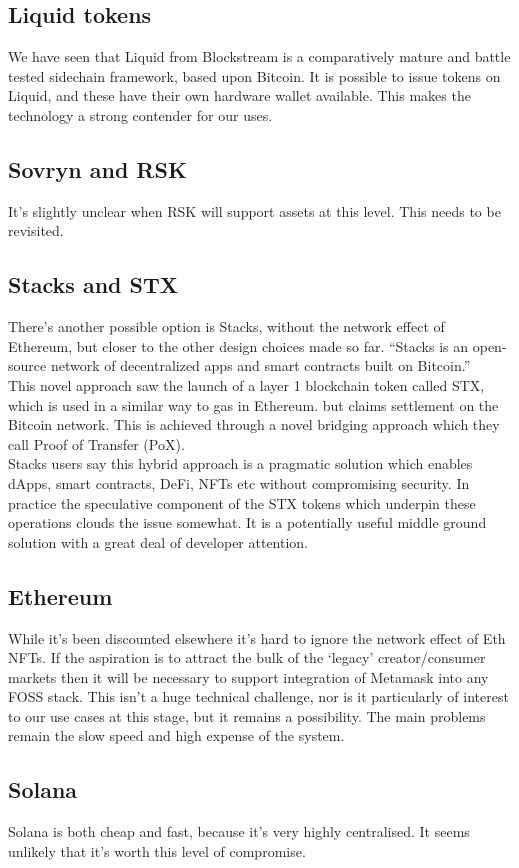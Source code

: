 \subsection{Liquid tokens}
We have seen that Liquid from Blockstream is a comparatively mature and battle tested sidechain framework, based upon Bitcoin. It is possible to issue tokens on Liquid, and these have their own hardware wallet available. This makes the technology a strong contender for our uses.
\subsection{Sovryn and RSK}
It's slightly unclear when RSK will support assets at this level. This needs to be revisited.
\subsection{Stacks and STX}
There's another possible option is Stacks, without the network effect of Ethereum, but closer to the other design choices made so far. ``Stacks is an open-source network of decentralized apps and smart contracts built on Bitcoin.''\\ 
This novel approach saw the launch of a layer 1 blockchain token called STX, which is used in a similar way to gas in Ethereum. but claims settlement on the Bitcoin network. This is achieved through a novel bridging approach which they call Proof of Transfer (PoX).\\
Stacks users say this hybrid approach is a pragmatic solution which enables dApps, smart contracts, DeFi, NFTs etc without compromising security. In practice the speculative component of the STX tokens which underpin these operations clouds the issue somewhat. It is a potentially useful middle ground solution with a great deal of developer attention.
\subsection{Ethereum}
While it's been discounted elsewhere it's hard to ignore the network effect of Eth NFTs. If the aspiration is to attract the bulk of the `legacy' creator/consumer markets then it will be necessary to support integration of Metamask into any FOSS stack. This isn't a huge technical challenge, nor is it particularly of interest to our use cases at this stage, but it remains a possibility. The main problems remain the slow speed and high expense of the system.
\subsection{Solana}
Solana is both cheap and fast, because it's very highly centralised. It seems unlikely that it's worth this level of compromise.
